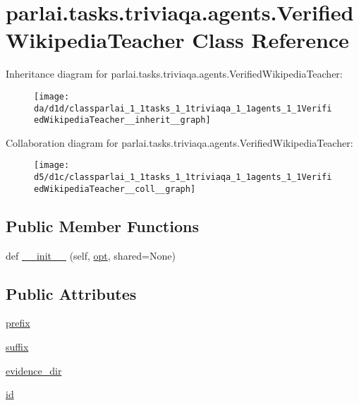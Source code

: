 \hypertarget{classparlai_1_1tasks_1_1triviaqa_1_1agents_1_1VerifiedWikipediaTeacher}{}\section{parlai.\+tasks.\+triviaqa.\+agents.\+Verified\+Wikipedia\+Teacher Class Reference}
\label{classparlai_1_1tasks_1_1triviaqa_1_1agents_1_1VerifiedWikipediaTeacher}


Inheritance diagram for parlai.\+tasks.\+triviaqa.\+agents.\+Verified\+Wikipedia\+Teacher\+:
\nopagebreak
\begin{figure}[H]
\begin{center}
\leavevmode
\texttt{[image: da/d1d/classparlai\_1\_1tasks\_1\_1triviaqa\_1\_1agents\_1\_1VerifiedWikipediaTeacher\_\_inherit\_\_graph]}
\end{center}
\end{figure}


Collaboration diagram for parlai.\+tasks.\+triviaqa.\+agents.\+Verified\+Wikipedia\+Teacher\+:
\nopagebreak
\begin{figure}[H]
\begin{center}
\leavevmode
\texttt{[image: d5/d1c/classparlai\_1\_1tasks\_1\_1triviaqa\_1\_1agents\_1\_1VerifiedWikipediaTeacher\_\_coll\_\_graph]}
\end{center}
\end{figure}
\subsection*{Public Member Functions}
\begin{DoxyCompactItemize}
\item 
def \hyperlink{classparlai_1_1tasks_1_1triviaqa_1_1agents_1_1VerifiedWikipediaTeacher_a6af307d6cf32536d5a860a0481bea4a5}{\+\_\+\+\_\+init\+\_\+\+\_\+} (self, \hyperlink{classparlai_1_1core_1_1agents_1_1Teacher_a3ce6243860ce978a897922863ed32fa4}{opt}, shared=None)
\end{DoxyCompactItemize}
\subsection*{Public Attributes}
\begin{DoxyCompactItemize}
\item 
\hyperlink{classparlai_1_1tasks_1_1triviaqa_1_1agents_1_1VerifiedWikipediaTeacher_a876c461eb0192fb040c30f4a2487c488}{prefix}
\item 
\hyperlink{classparlai_1_1tasks_1_1triviaqa_1_1agents_1_1VerifiedWikipediaTeacher_acc499929543ea473b7b298e28e22acab}{suffix}
\item 
\hyperlink{classparlai_1_1tasks_1_1triviaqa_1_1agents_1_1VerifiedWikipediaTeacher_a214e3d671d59a23a43315ccd367d8702}{evidence\+\_\+dir}
\item 
\hyperlink{classparlai_1_1tasks_1_1triviaqa_1_1agents_1_1VerifiedWikipediaTeacher_a37b2fd9a409408905a62cec4436774f2}{id}
\end{DoxyCompactItemize}
